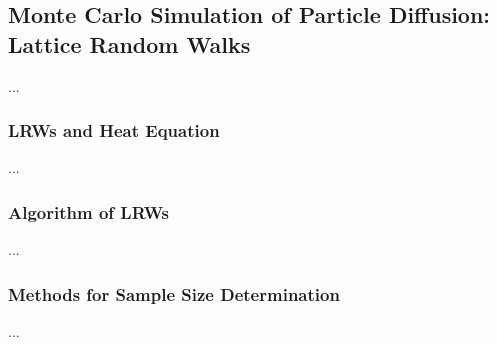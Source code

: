 \subsection{Monte Carlo Simulation of Particle Diffusion: Lattice Random Walks}


...


\subsubsection{LRWs and Heat Equation}


...


\subsubsection{Algorithm of LRWs}


...


\subsubsection{Methods for Sample Size Determination}


...




